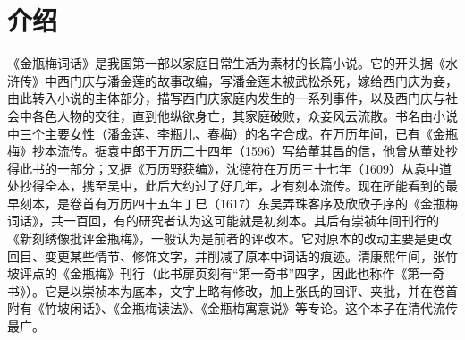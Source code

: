 \documentclass[letter,11pt,onecolumn,oneside]{book}
\title{\mydoctitle}
\author{\mydocauthor}
\date{}
\begin{document}
\maketitle

\frontmatter




\tableofcontents

\mainmatter

%





\pagestyle{special}
\appendix






\chapter*{介绍}

《金瓶梅词话》是我国第一部以家庭日常生活为素材的长篇小说。它的开头据《水浒传》中西门庆与潘金莲的故事改编，写潘金莲未被武松杀死，嫁给西门庆为妾，由此转入小说的主体部分，描写西门庆家庭内发生的一系列事件，以及西门庆与社会中各色人物的交往，直到他纵欲身亡，其家庭破败，众妾风云流散。书名由小说中三个主要女性（潘金莲、李瓶儿、春梅）的名字合成。在万历年间，已有《金瓶梅》抄本流传。据袁中郎于万历二十四年（1596）写给董其昌的信，他曾从董处抄得此书的一部分；又据《万历野获编》，沈德符在万历三十七年（1609）从袁中道处抄得全本，携至吴中，此后大约过了好几年，才有刻本流传。现在所能看到的最早刻本，是卷首有万历四十五年丁巳（1617）东吴弄珠客序及欣欣子序的《金瓶梅词话》，共一百回，有的研究者认为这可能就是初刻本。其后有崇祯年间刊行的《新刻绣像批评金瓶梅》，一般认为是前者的评改本。它对原本的改动主要是更改回目、变更某些情节、修饰文字，并削减了原本中词话的痕迹。清康熙年间，张竹坡评点的《金瓶梅》刊行（此书扉页刻有“第一奇书”四字，因此也称作《第一奇书》）。它是以崇祯本为底本，文字上略有修改，加上张氏的回评、夹批，并在卷首附有《竹坡闲话》、《金瓶梅读法》、《金瓶梅寓意说》等专论。这个本子在清代流传最广。
\end{document}
